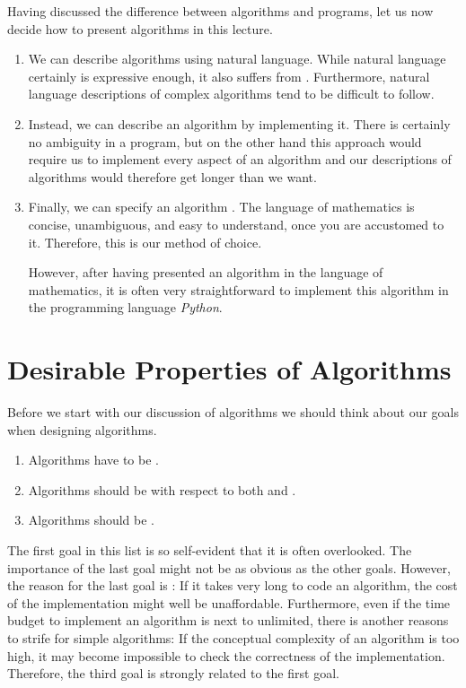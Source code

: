Having discussed the difference between algorithms and programs, let us now decide how to present
algorithms in this lecture.  
\begin{enumerate}
\item We can describe algorithms using natural language.  While natural language certainly is
      expressive enough, it also suffers from .  Furthermore, natural language
      descriptions of complex algorithms tend to be difficult to follow.
\item Instead, we can describe an algorithm by implementing it.  There is certainly no ambiguity
      in a program, but on the other hand this approach would require us to implement every aspect
      of an  algorithm and our descriptions of algorithms would therefore get longer than we want.
\item Finally, we can specify an algorithm .  The language of mathematics is 
      concise, unambiguous, and easy to understand, once you are accustomed to it.  Therefore, this is
      our method of choice.

      However, after having presented an algorithm in the language of mathematics, it is often very
      straightforward to implement this algorithm in the programming language \textsl{Python}.
\end{enumerate}

\section{Desirable Properties of Algorithms}
Before we start with our discussion of algorithms we should think about our goals when designing
algorithms.  
\begin{enumerate}
\item Algorithms have to be .
\item Algorithms should be  with respect to both  and .
\item Algorithms should be .
\end{enumerate}
The first goal in this list is so self-evident that it is often overlooked.  The
importance of the last goal might not be as obvious as the other goals.
However, the reason for the last goal is :  If it takes very long to code an algorithm, the
cost of the implementation might well be unaffordable.  Furthermore, even if the time budget to implement an
algorithm is next to unlimited,  there is another reasons to strife for simple algorithms:  If the conceptual
complexity of an algorithm is too high, it may become impossible to check the correctness of the
implementation.  Therefore, the third goal is strongly related to the first goal.  

